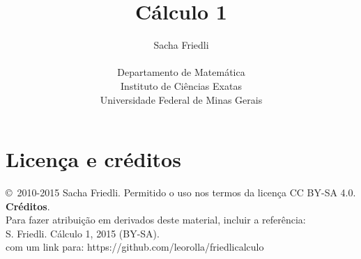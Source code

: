 \documentclass[12pt, reqno]{book}
\title{Cálculo 1}
\theoremstyle{plain}
\theoremstyle{definition}
\theoremstyle{estilo_exemplo}
\begin{document}
\frontmatter

\author{Sacha Friedli
\\
\\
Departamento de Matemática
\\
Instituto de Ciências Exatas
\\
Universidade Federal de Minas Gerais
}
\maketitle

\chapter{Licença e créditos}

\copyright\ 2010-2015 Sacha Friedli.
Permitido o uso nos termos da licença CC BY-SA 4.0. 
\\


\noindent
\textbf{Créditos}.
\\
Para fazer atribuição em derivados deste material, incluir a referência:
\\
S. Friedli. Cálculo 1, 2015 (BY-SA).
\\
com um link para: https://github.com/leorolla/friedlicalculo

%





\iflatexml
\else
\setcounter{tocdepth}{2}
\tableofcontents
\fi


\mainmatter


\setlength{\parskip}{0cm}












\end{document}
